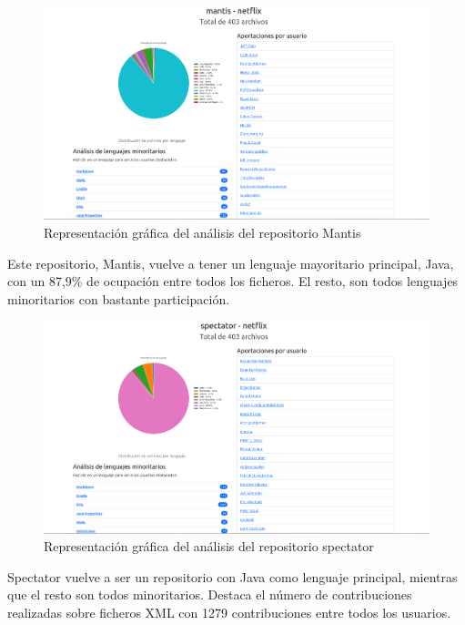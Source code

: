 \documentclass[a4paper, 12pt]{book}
\begin{document}
\begin{figure}[H]
  \centering
  \includegraphics[width=1\textwidth]{img/mantis.png}
  \caption{Representación gráfica del análisis del repositorio Mantis}
  \label{figura:analisismantis}
\end{figure}

Este repositorio, Mantis, vuelve a tener un lenguaje mayoritario principal, Java, con un 87,9\% de ocupación entre todos los ficheros. El resto, son todos lenguajes minoritarios con bastante participación.

\begin{figure}[H]
  \centering
  \includegraphics[width=1\textwidth]{img/spectator.png}
  \caption{Representación gráfica del análisis del repositorio spectator}
  \label{figura:analisisspectator}
\end{figure}

Spectator vuelve a ser un repositorio con Java como lenguaje principal, mientras que el resto son todos minoritarios. Destaca el número de contribuciones realizadas sobre ficheros XML con 1279 contribuciones entre todos los usuarios.

\end{document}
